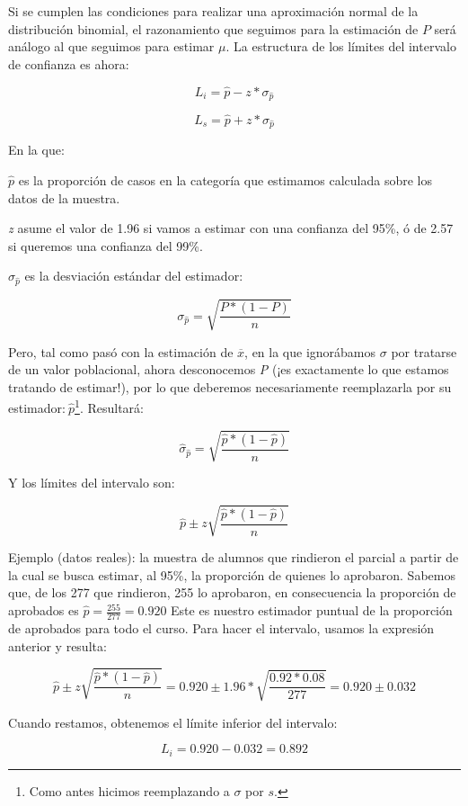 \documentclass[]{book}
\let\rmarkdownfootnote\footnote%
\def\footnote{\protect\rmarkdownfootnote}
\begin{document}
Si se cumplen las condiciones para realizar una aproximación normal de
la distribución binomial, el razonamiento que seguimos para la
estimación de \(P\) será análogo al que seguimos para estimar \(\mu\). La
estructura de los límites del intervalo de confianza es ahora:

\[L_{i} = \widehat{p} - z*\sigma_{\widehat{p}}\]

\[L_{s} = \widehat{p} + z*\sigma_{\widehat{p}}\]

En la que:

\(\widehat{p}\) es la proporción de casos en la categoría que estimamos
calculada sobre los datos de la muestra.

\emph{z} asume el valor de 1.96 si vamos a estimar con una confianza del 95\%, ó de 2.57 si queremos una confianza del 99\%.

\(\sigma_{\widehat{p}}\) es la desviación estándar del estimador:

\[\sigma_{\widehat{p}} = \sqrt{\frac{P*(1 - P)}{n}}\]

Pero, tal como pasó con la estimación de \(\overline{x}\), en la que
ignorábamos \(\sigma\) por tratarse de un valor poblacional, ahora
desconocemos \emph{P} (¡es exactamente lo que estamos tratando de estimar!),
por lo que deberemos necesariamente reemplazarla por su
estimador:\(\ \widehat{p}\)\footnote{Como antes hicimos reemplazando a \(\sigma\) por \(s\).}. Resultará:

\[{\widehat{\sigma}}_{\widehat{p}} = \sqrt{\frac{\widehat{p}*(1 - \widehat{p})}{n}}\]

Y los límites del intervalo son:

\[\widehat{p} \pm z\sqrt{\frac{\widehat{p}*(1 - \widehat{p})}{n}}\]

Ejemplo (datos reales): la muestra de alumnos que rindieron el parcial a
partir de la cual se busca estimar, al 95\%, la proporción de quienes lo
aprobaron. Sabemos que, de los 277 que rindieron, 255 lo aprobaron, en
consecuencia la proporción de aprobados es
\(\widehat{p} = \frac{255}{277} = 0.920\) Este es nuestro estimador
puntual de la proporción de aprobados para todo el curso. Para hacer el
intervalo, usamos la expresión anterior y resulta:

\[\widehat{p} \pm z\sqrt{\frac{\widehat{p}*(1 - \widehat{p})}{n}} = 0.920 \pm 1.96*\sqrt{\frac{0.92*0.08}{277}} = 0.920 \pm 0.032\]

Cuando restamos, obtenemos el límite inferior del intervalo:

\[L_{i} = 0.920 - 0.032 = 0.892\]
\end{document}
